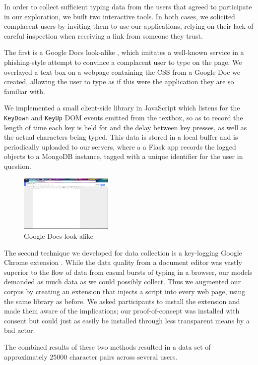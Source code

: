 \documentclass[9pt,journal]{IEEEtran}
\begin{document}
In order to collect sufficient typing data from the users that agreed to participate in our exploration, we built two interactive tools. In both cases, we solicited complacent users by inviting them to use our applications, relying on their lack of careful inspection when receiving a link from someone they trust.

The first is a Google Docs look-alike \cite{gdocs}, which imitates a well-known service in a phishing-style attempt to convince a complacent user to type on the page. We overlayed a text box on a webpage containing the CSS from a Google Doc we created, allowing the user to type as if this were the application they are so familiar with.

We implemented a small client-side library in JavaScript which listens for the \texttt{KeyDown} and \texttt{KeyUp} DOM events emitted from the textbox, so as to record the length of time each key is held for and the delay between key presses, as well as the actual characters being typed. This data is stored in a local buffer and is periodically uploaded to our servers, where a a Flask app records the logged objects to a MongoDB instance, tagged with a unique identifier for the user in question.

\begin{figure}[H]
  \centering
  \includegraphics[width=0.4\textwidth]{gdocs}
  \caption{Google Docs look-alike}
\end{figure}

The second technique we developed for data collection is a key-logging Google Chrome extension \cite{extension}. While the data quality from a document editor was vastly superior to the flow of data from casual bursts of typing in a browser, our models demanded as much data as we could possibly collect. Thus we augmented our corpus by creating an extension that injects a script into every web page, using the same library as before. We asked participants to install the extension and made them aware of the implications; our proof-of-concept was installed with consent but could just as easily be installed through less transparent means by a bad actor.

The combined results of these two methods resulted in a data set of approximately $25000$ character pairs across several users.
\end{document}
